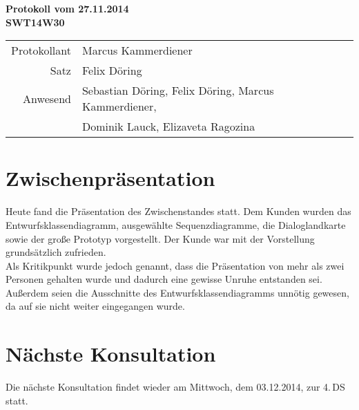 \documentclass{scrartcl}
\begin{document}
\begin{center}
\LARGE \bf{Protokoll vom 27.11.2014 \\
SWT14W30}
\end{center}

\begin{tabular}{rp{10cm}}
Protokollant & Marcus Kammerdiener \\
Satz & Felix Döring \\
Anwesend & Sebastian Döring, Felix Döring, Marcus Kammerdiener,\\
& Dominik Lauck, Elizaveta Ragozina \\
\end{tabular}

\vspace*{3em}

\section{Zwischenpräsentation}
Heute fand die Präsentation des Zwischenstandes statt. Dem Kunden wurden das Entwurfsklassendiagramm, ausgewählte Sequenzdiagramme, die Dialoglandkarte sowie der große Prototyp vorgestellt. Der Kunde war mit der Vorstellung grundsätzlich zufrieden.\\
Als Kritikpunkt wurde jedoch genannt, dass die Präsentation von mehr als zwei Personen gehalten wurde und dadurch eine gewisse Unruhe entstanden sei. Außerdem seien die Ausschnitte des Entwurfsklassendiagramms unnötig gewesen, da auf sie nicht weiter eingegangen wurde. 

\vspace*{1em}

\section{N\"achste Konsultation}
Die nächste Konsultation findet wieder am Mittwoch, dem 03.12.2014, zur 4.\,DS statt.
\end{document}
